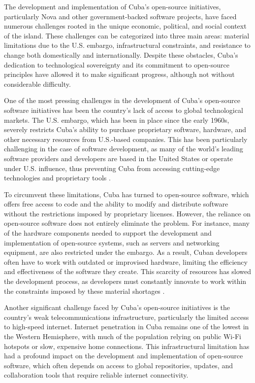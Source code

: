 \begin{refsection}
The development and implementation of Cuba’s open-source initiatives, particularly Nova and other government-backed software projects, have faced numerous challenges rooted in the unique economic, political, and social context of the island. These challenges can be categorized into three main areas: material limitations due to the U.S. embargo, infrastructural constraints, and resistance to change both domestically and internationally. Despite these obstacles, Cuba’s dedication to technological sovereignty and its commitment to open-source principles have allowed it to make significant progress, although not without considerable difficulty.

One of the most pressing challenges in the development of Cuba’s open-source software initiatives has been the country’s lack of access to global technological markets. The U.S. embargo, which has been in place since the early 1960s, severely restricts Cuba’s ability to purchase proprietary software, hardware, and other necessary resources from U.S.-based companies. This has been particularly challenging in the case of software development, as many of the world’s leading software providers and developers are based in the United States or operate under U.S. influence, thus preventing Cuba from accessing cutting-edge technologies and proprietary tools \cite[pp.~67-89]{feinberg}.

To circumvent these limitations, Cuba has turned to open-source software, which offers free access to code and the ability to modify and distribute software without the restrictions imposed by proprietary licenses. However, the reliance on open-source software does not entirely eliminate the problem. For instance, many of the hardware components needed to support the development and implementation of open-source systems, such as servers and networking equipment, are also restricted under the embargo. As a result, Cuban developers often have to work with outdated or improvised hardware, limiting the efficiency and effectiveness of the software they create. This scarcity of resources has slowed the development process, as developers must constantly innovate to work within the constraints imposed by these material shortages \cite[pp.~90-110]{kapcia}.

Another significant challenge faced by Cuba’s open-source initiatives is the country’s weak telecommunications infrastructure, particularly the limited access to high-speed internet. Internet penetration in Cuba remains one of the lowest in the Western Hemisphere, with much of the population relying on public Wi-Fi hotspots or slow, expensive home connections. This infrastructural limitation has had a profound impact on the development and implementation of open-source software, which often depends on access to global repositories, updates, and collaboration tools that require reliable internet connectivity.


\end{refsection}
